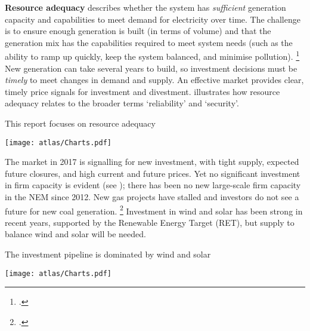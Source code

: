 \documentclass[FrontPage]{grattan}
\begin{document}
\textbf{Resource adequacy} describes whether the system has \emph{sufficient} generation capacity and capabilities to meet demand for electricity over time. The challenge is to ensure enough generation is built (in terms of volume) and that the generation mix has the capabilities required to meet system needs (such as the ability to ramp up quickly, keep the system balanced, and minimise pollution).%
\footcite{Simshauser2010ResourceAdequacy} 
New generation can take several years to build, so investment decisions must be \emph{timely} to meet changes in demand and supply. An effective market provides clear, timely price signals for investment and divestment.  illustrates how resource adequacy relates to the broader terms `reliability' and `security'.

\begin{figureTop}
\caption{This report focuses on resource adequacy}\label{fig:resource-adequacy-is-the-focus-of-this-report}
\units{}
\texttt{[image: atlas/Charts.pdf]}
\end{figureTop}

The market in 2017 is signalling for new investment, with tight supply, expected future closures, and high current and future prices. Yet no significant investment in firm capacity is evident (see ); there has been no new large-scale firm capacity in the NEM since 2012. New gas projects have stalled and investors do not see a future for new coal generation.%
\footcite{AEC2017CoalInTheNEM}
Investment in wind and solar has been strong in recent years, supported by the Renewable Energy Target (RET), but supply to balance wind and solar will be needed.

\begin{figureTop}
\caption{The investment pipeline is dominated by wind and solar}\label{fig:investment-pipeline-is-predominantly-wind-and-solar}
\texttt{[image: atlas/Charts.pdf]}
\end{figureTop}
\end{document}
